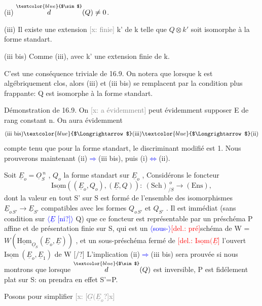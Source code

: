 \documentclass[11pt]{article}
\newcommand{\scanpage}[1]{\par\bigskip\noindent{\small\sffamily[scan #1]}\par}
\newcommand{\mspage}[1]{{\small\sffamily[p.\,#1]}}
\newcommand{\hand}[1]{\textcolor{blue}{#1}}
\newcommand{\inserted}[2][]{\textcolor{blue}{$\langle$#2$\rangle$}}
\newcommand{\deleted}[1]{\textcolor{red}{[\textsf{del.:} #1]}}
\newcommand{\xout}[1]{\textcolor{gray}{[\textsf{x:} #1]}}
\newcommand{\unsure}[1]{[#1?]}
\begin{document}
(ii) $\overset{\hand{$\sim$}}{d}(Q) \neq 0$.

(iii) Il existe une extension \xout{finie} k' de k telle que $Q\otimes k'$ soit
isomorphe à la forme standart.

(iii bis) Comme (iii), avec k' une extension finie de k.

C'est une conséquence triviale de 16.9. On notera que lorsque k est
algébriquement clos, alors (iii) et (iii bis) se remplacent par la
condition plus frappante: Q est isomorphe à la forme standart.

Démonstration de 16.9. On \xout{a évidemment} peut évidemment
supposer E de rang constant n. On aura évidemment
\[ \text{(iii bis)} \hand{$\Longrightarrow$} \text{(iii)} \hand{$\Longrightarrow$} \text{(ii)} \]
compte tenu que pour la forme standart, le discriminant modifié est 1.
Nous prouverons maintenant (ii)\hand{$\Longrightarrow$}(iii bis), puis (i)\hand{$\Longleftrightarrow$}(ii).

Soit $\underline{E}_o = \underline{O}_S^{\ n}$ , $Q_o$ la forme standart sur $\underline{E}_o$ , Considérons le
foncteur
\[ \underline{\mathrm{Isom}}( (\underline{E}_o,Q_o),(\underline{E},Q)) :\ (\mathrm{Sch})_{/S}^{\ o} \longrightarrow (\mathrm{Ens}) , \]
dont la valeur en tout S' sur S est formé de l'ensemble des isomorphismes
$\underline{E}_{o\,S'} \to \underline{E}_{S'}$ compatibles avec les formes $Q_{o\,S'}$ et $Q_{S'}$ . Il est immédiat
(sans condition sur \inserted{$\underline{E}$ \unsure{ni}} Q) que ce foncteur est représentable par un préschéma
P affine et de présentation finie sur S, qui est un \inserted[typed]{sous-}\deleted{pré}schéma de W =
$W(\underline{\mathrm{Hom}}_{\underline{O}_S}(\underline{E}_o,\underline{E}))$ , et un sous-préschéma fermé de \deleted{$\underline{\mathrm{Isom}}(\underline{E}$} l'ouvert
$\underline{\mathrm{Isom}}\ (\underline{E}_o,\underline{E}_1)$ de W \unsure{/} L'implication (ii)\hand{$\Longrightarrow$}(iii bis) sera prouvée si
nous montrons que lorsque $\overset{\hand{$\sim$}}{d}(Q)$ est inversible, P est fidélement plat
sur S: on prendra en effet S'=P.

Posons pour simplifier \xout{\unsure{$\underline{G}(\underline{E}_o$}x}

\mspage{\hand{178}}

\clearpage
\scanpage{25/179}
\mspage{\hand{6}}
\end{document}

